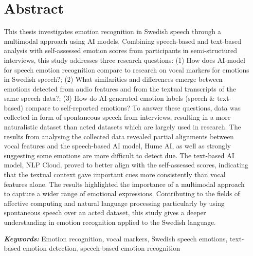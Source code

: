\newpage
\chapter*{Abstract}
{}

This thesis investigates emotion recognition in Swedish speech through a multimodal approach using AI models. Combining speech-based and text-based analysis with self-assessed emotion scores from participants in semi-structured interviews, this study addresses three research questions: (1) How does AI-model for speech emotion recognition compare to research on vocal markers for emotions in Swedish speech?; (2) What similarities and differences emerge between emotions detected from audio features and from the textual transcripts of the same speech data?; (3) How do AI-generated emotion labels (speech \& text-based) compare to self-reported emotions?
To answer these questions, data was collected in form of spontaneous speech from interviews, resulting in a more naturalistic dataset than acted datasets which are largely used in research. The results from analysing the collected data revealed partial alignments between vocal features and the speech-based AI model, Hume AI, as well as strongly suggesting some emotions are more difficult to detect due. The text-based AI model, NLP Cloud, proved to better align with the self-assessed scores, indicating that the textual context gave important cues more consistently than vocal features alone. The results highlighted the importance of a multimodal approach to capture a wider range of emotional expressions. 
Contributing to the fields of affective computing and natural language processing particularly by using spontaneous speech over an acted dataset, this study gives a deeper understanding in emotion recognition applied to the Swedish language.

\vspace{0.6cm}
{

{\parindent=0cm\Large\textit{\textbf{Keywords:}}}
Emotion recognition, vocal markers, Swedish speech emotions, text-based emotion detection, speech-based emotion recognition 

\vspace{0.3cm}


}